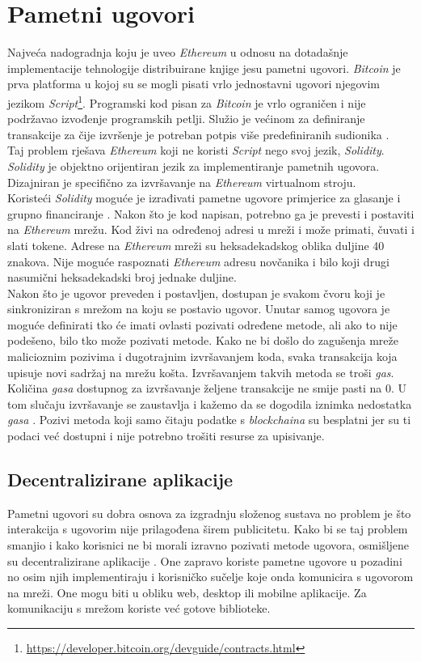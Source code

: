 \documentclass[times, utf8, zavrsni, numeric]{fer}
\begin{document}
\section{Pametni ugovori}
Najveća nadogradnja koju je uveo \emph{Ethereum} u odnosu na dotadašnje implementacije tehnologije distribuirane knjige jesu pametni ugovori.
\emph{Bitcoin} je prva platforma u kojoj su se mogli pisati vrlo jednostavni ugovori njegovim jezikom \emph{Script}\footnote{\url{https://developer.bitcoin.org/devguide/contracts.html}}.
Programski kod pisan za \emph{Bitcoin} je vrlo ograničen i nije podržavao izvođenje programskih petlji. Služio je većinom za definiranje transakcije za čije izvršenje
je potreban potpis više predefiniranih sudionika . \\
Taj problem rješava \emph{Ethereum} koji ne koristi \emph{Script} nego svoj jezik, \emph{Solidity}. \emph{Solidity} je objektno orijentiran jezik za implementiranje pametnih
ugovora. Dizajniran je specifično za izvršavanje na \emph{Ethereum} virtualnom stroju. \\
Koristeći \emph{Solidity} moguće je izrađivati pametne ugovore primjerice za glasanje i grupno financiranje .\citep{solidity}
Nakon što je kod napisan, potrebno ga je prevesti i postaviti na \emph{Ethereum} mrežu. Kod živi na određenoj adresi u mreži i može primati, čuvati i slati tokene.
Adrese na \emph{Ethereum} mreži su heksadekadskog oblika duljine 40 znakova. Nije moguće raspoznati \emph{Ethereum} adresu novčanika i bilo koji drugi nasumični 
heksadekadski broj jednake duljine. \\
Nakon što je ugovor preveden i postavljen, dostupan je svakom čvoru koji je sinkroniziran s mrežom na koju se postavio ugovor. Unutar samog ugovora je moguće definirati
tko će imati ovlasti pozivati određene metode, ali ako to nije podešeno, bilo tko može pozivati metode. Kako ne bi došlo do zagušenja mreže malicioznim pozivima i 
dugotrajnim izvršavanjem koda, svaka transakcija koja upisuje novi sadržaj na mrežu košta. Izvršavanjem takvih metoda se troši \emph{gas}. Količina \emph{gasa} dostupnog
za izvršavanje željene transakcije ne smije pasti na 0. U tom slučaju izvršavanje se zaustavlja i kažemo da se dogodila iznimka nedostatka
 \emph{gasa} .\citep{yellowpaper}
Pozivi metoda koji samo čitaju podatke s \emph{blockchaina} su besplatni jer su ti podaci već dostupni i nije potrebno trošiti resurse za upisivanje.
\subsection{Decentralizirane aplikacije}
Pametni ugovori su dobra osnova za izgradnju složenog sustava no problem je što interakcija s ugovorim nije prilagođena širem publicitetu. Kako bi se taj problem smanjio
i kako korisnici ne bi morali izravno pozivati metode ugovora, osmišljene su decentralizirane aplikacije . One zapravo koriste pametne ugovore u pozadini
no osim njih implementiraju i korisničko sučelje koje onda komunicira s ugovorom na mreži. One mogu biti u obliku web, desktop ili mobilne aplikacije. Za komunikaciju
s mrežom koriste već gotove biblioteke. \\
\end{document}

